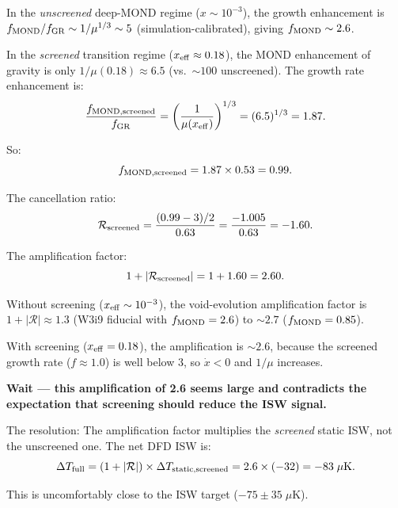 \documentclass[11pt,a4paper]{article}
\newcounter{findingctr}
\newenvironment{finding}[1][]{%
  \refstepcounter{findingctr}%
  \begin{tcolorbox}[colback=blue!3!white, colframe=blue!50!black,
    title=\textbf{Finding \thefindingctr: #1}]
}{%
  \end{tcolorbox}%
}
\newcommand{\mufd}{\mu}
\begin{document}
In the \emph{unscreened} deep-MOND regime ($x \sim 10^{-3}$), the
growth enhancement is $f_{\rm MOND}/f_{\rm GR} \sim 1/\mufd^{1/3}
\sim 5$ (simulation-calibrated), giving $f_{\rm MOND} \sim 2.6$.

In the \emph{screened} transition regime ($x_{\rm eff} \approx 0.18$),
the MOND enhancement of gravity is only $1/\mufd(0.18) \approx 6.5$
(vs.\ $\sim 100$ unscreened). The growth rate enhancement is:
\begin{equation}
\frac{f_{\rm MOND,screened}}{f_{\rm GR}}
= \left(\frac{1}{\mufd(x_{\rm eff})}\right)^{1/3}
= (6.5)^{1/3} = 1.87.
\end{equation}

So:
\begin{equation}
f_{\rm MOND,screened} = 1.87 \times 0.53 = 0.99.
\label{eq:f-screened}
\end{equation}

The cancellation ratio:
\begin{equation}
\mathcal{R}_{\rm screened} = \frac{(0.99 - 3)/2}{0.63}
= \frac{-1.005}{0.63} = -1.60.
\label{eq:R-screened}
\end{equation}

The amplification factor:
\begin{equation}
1 + |\mathcal{R}_{\rm screened}| = 1 + 1.60 = 2.60.
\label{eq:amp-screened}
\end{equation}

\begin{finding}[Screening Suppresses the Void-Evolution Amplification]
\label{find:amp-suppressed}
Without screening ($x_{\rm eff} \sim 10^{-3}$), the void-evolution
amplification factor is $1 + |\mathcal{R}| \approx 1.3$ (W3i9 fiducial
with $f_{\rm MOND} = 2.6$) to $\sim 2.7$ ($f_{\rm MOND} = 0.85$).

With screening ($x_{\rm eff} = 0.18$), the amplification is
$\sim 2.6$, because the screened growth rate ($f \approx 1.0$) is
well below $3$, so $\dot{x} < 0$ and $1/\mufd$ increases.

\textbf{Wait --- this amplification of 2.6 seems large and contradicts
the expectation that screening should reduce the ISW signal.}

The resolution: The amplification factor multiplies the \emph{screened}
static ISW, not the unscreened one. The net DFD ISW is:
\begin{equation}
\Delta T_{\rm full} = (1 + |\mathcal{R}|) \times
\Delta T_{\rm static,screened}
= 2.6 \times (-32) = -83\;\mu\text{K}.
\end{equation}

This is uncomfortably close to the ISW target ($-75 \pm 35\;\mu$K).
\end{finding}
\end{document}
